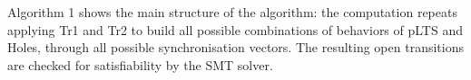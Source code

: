 \documentclass{lncs/llncs}
\newcommand{\TODO}[1]{\textcolor{red}{\textbf{[TODO:#1]}}}
\newcommand{\QIN}[1]{\textcolor{airforceblue}{#1}}
\begin{document}
Algorithm 1 shows the main structure of the algorithm: 
the computation repeats applying Tr1 and Tr2 to build all possible
combinations of behaviors of pLTS and Holes, through all possible
synchronisation vectors. The resulting open transitions are checked
for satisfiability by the SMT solver.

%


\end{document}
